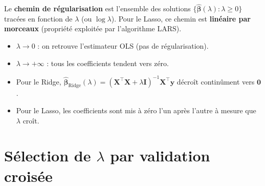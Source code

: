 \begin{definition}
Le \textbf{chemin de r\'egularisation} est l'ensemble des solutions
$\{\hat{\bm{\beta}}(\lambda) : \lambda \geq 0\}$ trac\'ees en fonction de $\lambda$
(ou $\log \lambda$). Pour le Lasso, ce chemin est \textbf{lin\'eaire par morceaux}
(propri\'et\'e exploit\'ee par l'algorithme LARS).
\end{definition}

\begin{remarque}
\begin{itemize}
  \item $\lambda \to 0$ : on retrouve l'estimateur OLS (pas de r\'egularisation).
  \item $\lambda \to +\infty$ : tous les coefficients tendent vers z\'ero.
  \item Pour le Ridge, $\hat{\bm{\beta}}_{\text{Ridge}}(\lambda) = (\bm{X}^\top\bm{X} + \lambda\bm{I})^{-1}\bm{X}^\top\bm{y}$
        d\'ecro\^it continûment vers $\bm{0}$.
  \item Pour le Lasso, les coefficients sont mis \`a z\'ero l'un apr\`es l'autre
        \`a mesure que $\lambda$ cro\^it.
\end{itemize}
\end{remarque}

\section{S\'election de $\lambda$ par validation crois\'ee}
\label{sec:cv-lambda}

